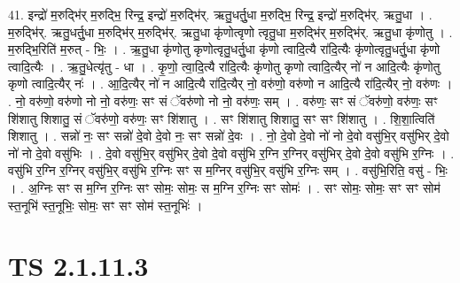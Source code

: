 \documentclass[17pt]{extarticle}
\begin{document}
41. इन्द्रो॑ म॒रुद्भि॑र् म॒रुद्भि॒ रिन्द्र॒ इन्द्रो॑ म॒रुद्भि॑र्. ऋतु॒धर्तु॒धा म॒रुद्भि॒ रिन्द्र॒ इन्द्रो॑ म॒रुद्भि॑र्. ऋतु॒धा । . म॒रुद्भि॑र्. ऋतु॒धर्तु॒धा म॒रुद्भि॑र् म॒रुद्भि॑र्. ऋतु॒धा कृ॑णोत्वृणो त्वृतु॒धा म॒रुद्भि॑र् म॒रुद्भि॑र्. ऋतु॒धा कृ॑णोतु । . म॒रुद्भि॒रिति॑ म॒रुत् - भिः॒ । . ऋ॒तु॒धा कृ॑णोतु कृणोत्वृतु॒धर्तु॒धा कृ॑णो त्वादि॒त्यै रा॑दि॒त्यैः 
कृ॑णोत्वृतु॒धर्तु॒धा कृ॑णो त्वादि॒त्यैः । . ऋ॒तु॒धेत्यृ॑तु - धा । . कृ॒णो॒ त्वा॒दि॒त्यै रा॑दि॒त्यैः कृ॑णोतु कृणो त्वादि॒त्यैर् नो॑ न आदि॒त्यैः कृ॑णोतु कृणो त्वादि॒त्यैर् नः॑ । . आ॒दि॒त्यैर् नो॑ न आदि॒त्यै रा॑दि॒त्यैर् नो॒ वरु॑णो॒ वरु॑णो न आदि॒त्यै रा॑दि॒त्यैर् नो॒ वरु॑णः । . नो॒ वरु॑णो॒ वरु॑णो नो नो॒ वरु॑णः॒ सꣳ सं ॅवरु॑णो नो नो॒ वरु॑णः॒ सम् । . वरु॑णः॒ सꣳ सं ॅवरु॑णो॒ वरु॑णः॒ सꣳ शि॑शातु शिशातु॒ सं ॅवरु॑णो॒ वरु॑णः॒ सꣳ शि॑शातु । . सꣳ शि॑शातु शिशातु॒ सꣳ सꣳ शि॑शातु । . शि॒शा॒त्विति॑ शिशातु । . सन्नो॑ नः॒ सꣳ सन्नो॑ दे॒वो दे॒वो नः॒ सꣳ सन्नो॑ दे॒वः । . नो॒ दे॒वो दे॒वो नो॑ नो दे॒वो वसु॑भि॒र् वसु॑भिर् दे॒वो नो॑ नो दे॒वो वसु॑भिः । . दे॒वो वसु॑भि॒र् वसु॑भिर् दे॒वो दे॒वो वसु॑भि र॒ग्नि र॒ग्निर् वसु॑भिर् दे॒वो दे॒वो वसु॑भि र॒ग्निः । . वसु॑भि र॒ग्नि र॒ग्निर् वसु॑भि॒र् वसु॑भि र॒ग्निः सꣳ स म॒ग्निर् वसु॑भि॒र् वसु॑भि र॒ग्निः सम् । . वसु॑भि॒रिति॒ वसु॑ - भिः॒ । . अ॒ग्निः सꣳ स म॒ग्नि र॒ग्निः सꣳ सोमः॒ सोमः॒ स म॒ग्नि र॒ग्निः सꣳ सोमः॑ । . सꣳ सोमः॒ सोमः॒ सꣳ सꣳ सोम॑ स्त॒नूभि॑ स्त॒नूभिः॒ सोमः॒ सꣳ सꣳ सोम॑ स्त॒नूभिः॑ । \newline
\pagebreak
{}

\section{ TS 2.1.11.3 }
\end{document}
